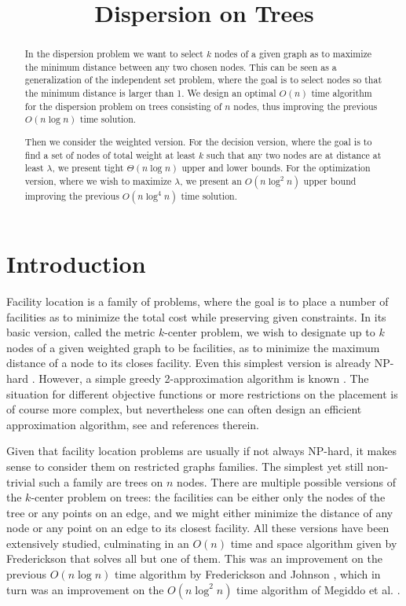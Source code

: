 \documentclass[11pt,a4paper]{article}
\newcommand{\Oh}{{O}}
\theoremstyle{definition}
\theoremstyle{remark}
\begin{document}
\title{Dispersion on Trees}
\author[1]{}


\date{}
\maketitle

\begin{abstract}
In the dispersion problem we want to select $k$ nodes of a given graph as to maximize
the minimum distance between any two chosen nodes. This can be seen as a generalization
of the independent set problem, where the goal is to select nodes so that the minimum distance
is larger than 1.
We design an optimal $\Oh(n)$ time algorithm for the dispersion problem on trees consisting
of $n$ nodes, thus improving the previous $\Oh(n\log n)$ time solution. 

Then we consider the weighted version. 
For the decision
version, where the goal is to find a set of nodes of
total weight at least $k$ such that any two nodes are at distance at least $\lambda$, we present tight $\Theta(n\log n)$ upper and lower bounds. For the optimization version, where we wish to maximize  $\lambda$, we present an
 $\Oh(n\log^2n)$ upper bound improving the previous $\Oh(n\log^4 n)$ time solution. 
\end{abstract}

\section{Introduction}
Facility location is a family of problems, where the goal is to place
a number of facilities as to minimize the total cost while preserving
given constraints. In its basic version, called the metric $k$-center
problem, we wish to designate up to $k$ nodes of a given weighted graph
to be facilities, as to minimize the maximum distance of a node to its
closes facility. Even this simplest version is already NP-hard \cite{Vazirani2003}. However, a simple greedy 2-approximation algorithm is known \cite{Gonzalez1985}. The situation for different
objective functions or more restrictions on the placement is of course
more complex, but nevertheless one can often design an efficient
approximation algorithm, see \cite{DavidB.Shmoys1997} and  references
therein.

Given that facility location problems are usually if not always
NP-hard, it makes sense to consider them on restricted 
graphs families. The simplest yet still non-trivial such a family are trees on
$n$ nodes. There are multiple possible versions of the $k$-center
problem on trees: the facilities can be either only the nodes of the
tree or any points on an edge, and we might either minimize the
distance of any node or any point on an edge to its closest facility.
All these versions have been extensively studied, culminating in an
$\Oh(n)$ time and space algorithm given by Frederickson \cite{Frederickson1991a} that
solves all but one of them. This was an improvement on the previous
$\Oh(n\log n)$ time algorithm by Frederickson and Johnson \cite{Frederickson1983}, which in turn was an improvement
on the $\Oh(n\log^2n)$ time algorithm of Megiddo et al. \cite{Megiddo1981}. 
\end{document}

